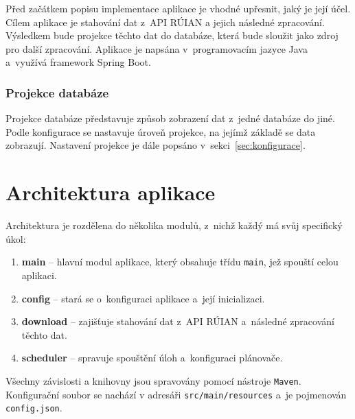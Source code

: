 Před začátkem popisu implementace aplikace je vhodné upřesnit, jaký je její účel.
Cílem aplikace je stahování dat z~API RÚIAN a jejich následné zpracování.
Výsledkem bude projekce těchto dat do databáze, která bude sloužit jako zdroj pro další zpracování.
Aplikace je napsána v~programovacím jazyce Java a~využívá framework Spring Boot.

\subsubsection*{Projekce databáze}
Projekce databáze představuje způsob zobrazení dat z~jedné databáze do jiné.
Podle konfigurace se nastavuje úroveň projekce, na jejímž základě se data zobrazují.
Nastavení projekce je dále popsáno v~sekci~\ref{sec:konfigurace}.

\section{Architektura aplikace}
Architektura je rozdělena do několika modulů, z~nichž každý má svůj specifický úkol:
\begin{enumerate}
    \item \textbf{main} -- hlavní modul aplikace, který obsahuje třídu \texttt{main}, jež spouští celou aplikaci.
    \item \textbf{config} -- stará se o~konfiguraci aplikace a~její inicializaci.
    \item \textbf{download} -- zajišťuje stahování dat z~API RÚIAN a~následné zpracování těchto dat.
    \item \textbf{scheduler} -- spravuje spouštění úloh a~konfiguraci plánovače.
\end{enumerate}
Všechny závislosti a knihovny jsou spravovány pomocí nástroje \texttt{Maven}.
Konfigurační soubor se nachází v adresáři \texttt{src/main/resources} a~je pojmenován \texttt{config.json}.